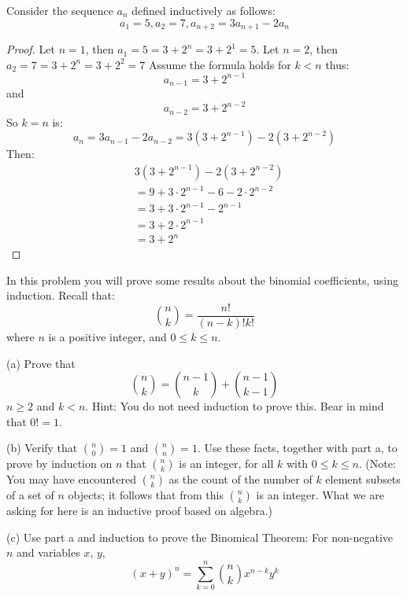 \begin{tcolorbox}[title=Problem 12, breakable]
    Consider the sequence ${a_n}$ defined inductively as follows:
    \[a_1 = 5, a_2  = 7, a_{n + 2} = 3a_{n + 1} - 2a_n\]
\end{tcolorbox}

\begin{proof}
    Let $n = 1$, then $a_1 = 5 = 3 + 2^n =  3 + 2^1 = 5$.
    Let $n = 2$, then $a_2 = 7 = 3 + 2^n = 3 + 2^2 = 7$
    Assume the formula holds for $k < n$ thus:
    \[a_{n - 1} = 3 + 2^{n - 1}\]
    and 
    \[a_{n - 2} = 3 + 2^{n - 2}\]
    So $k = n$ is:
    \[a_{n} = 3a_{n - 1} - 2a_{n - 2} = 3(3 + 2^{n - 1}) - 2(3 + 2^{n - 2})\]
    Then:
    \begin{align*}
         & 3(3 + 2^{n - 1}) - 2(3 + 2^{n - 2})             \\
         & = 9 + 3 \cdot 2^{n - 1} - 6 - 2 \cdot 2^{n - 2} \\
         & = 3 + 3 \cdot 2^{n - 1} - 2^{n - 1}             \\
         & = 3 + 2 \cdot 2^{n - 1}                         \\
         & = 3 + 2^n                            
    \end{align*}
\end{proof}

\begin{tcolorbox}[title=Problem 14, breakable]
    In this problem you will prove some results about the binomial coefficients, using induction.
    Recall that:
    \[\binom{n}{k} = \frac{n!}{(n - k)!k!}\]
    where $n$ is a positive integer, and $0 \le k \le n$.

    (a) Prove that 
    \[\binom{n}{k} = \binom{n - 1}{k} + \binom{n - 1}{k - 1}\]
    $n \ge 2$ and $k < n$. Hint: You do not need induction to prove this.
    Bear in mind that $0! = 1$.

    (b) Verify that $\binom{n}{0} = 1$ and $\binom{n}{n} = 1$. Use these facts,
    together with part a, to prove by induction on $n$ that $\binom{n}{k}$ is an integer,
    for all $k$ with $0 \le k \le n$. (Note: You may have encountered $\binom{n}{k}$ as the 
    count of the number of $k$ element subsets of a set of $n$ objects; it follows that from this 
    $\binom{n}{k}$ is an integer. What we are asking for here is an inductive proof based on algebra.)

    (c) Use part a and induction to prove the Binomical Theorem: For non-negative $n$ and variables $x$, $y$,
    \[{(x + y)}^n = \sum_{k = 0}^{n} \binom{n}{k}x^{n - k}y^k\]
\end{tcolorbox}

